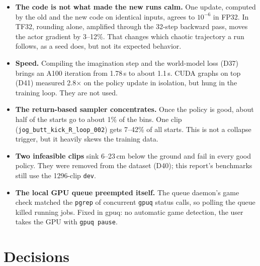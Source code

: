 \documentclass[10pt]{article}
\begin{document}
\begin{itemize}
  \item \textbf{The code is not what made the new runs calm.} One update, computed by the old and the
  new code on identical inputs, agrees to $10^{-6}$ in FP32. In TF32, rounding alone, amplified through
  the 32-step backward pass, moves the actor gradient by 3--12\%. That changes which chaotic trajectory
  a run follows, as a seed does, but not its expected behavior.
  \item \textbf{Speed.} Compiling the imagination step and the world-model loss (D37) brings an A100
  iteration from 1.78\,s to about 1.1\,s. CUDA graphs on top (D41) measured 2.8$\times$ on the policy
  update in isolation, but hung in the training loop. They are not used.
  \item \textbf{The return-based sampler concentrates.} Once the policy is good, about half of the starts
  go to about 1\% of the bins. One clip (\texttt{jog\_butt\_kick\_R\_loop\_002}) gets 7--42\% of all
  starts. This is not a collapse trigger, but it heavily skews the training data.
  \item \textbf{Two infeasible clips} sink 6--23\,cm below the ground and fail in every good policy. They
  were removed from the dataset (D40); this report's benchmarks still use the 1296-clip \texttt{dev}.
  \item \textbf{The local GPU queue preempted itself.} The queue daemon's game check matched the
  \texttt{pgrep} of concurrent \texttt{gpuq} status calls, so polling the queue killed running jobs.
  Fixed in gpuq: no automatic game detection, the user takes the GPU with \texttt{gpuq pause}.
\end{itemize}

\section{Decisions}
\end{document}
